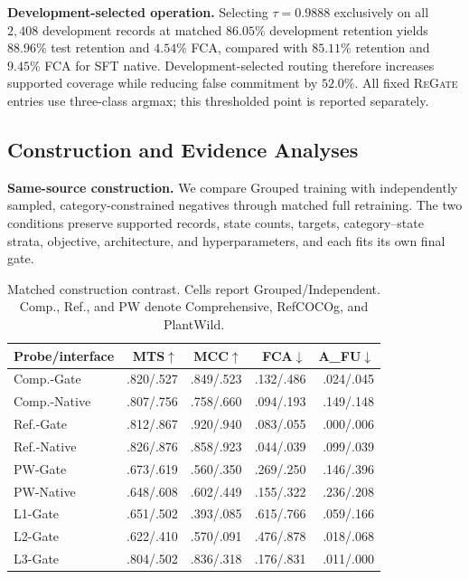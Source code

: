 \documentclass[letterpaper]{article}
\newcommand{\Method}{\textsc{ReGate}\xspace}
\begin{document}
\textbf{Development-selected operation.}
Selecting $\tau=0.9888$ exclusively on all $2{,}408$ development records at matched $86.05\%$ development retention yields $88.96\%$ test retention and $4.54\%$ FCA, compared with $85.11\%$ retention and $9.45\%$ FCA for SFT native. Development-selected routing therefore increases supported coverage while reducing false commitment by $52.0\%$. All fixed \Method entries use three-class argmax; this thresholded point is reported separately.

\subsection{Construction and Evidence Analyses}
\label{sec:diagnostic_probes}
\label{sec:grouping_ablation}

\textbf{Same-source construction.}
We compare Grouped training with independently sampled, category-constrained negatives through matched full retraining. The two conditions preserve supported records, state counts, targets, category--state strata, objective, architecture, and hyperparameters, and each fits its own final gate.

\begin{table}[t]
\centering
\small
\setlength{\tabcolsep}{0.7mm}
\begin{tabular*}{\columnwidth}{@{\extracolsep{\fill}}lrrrr@{}}
\toprule
Probe/interface & MTS$\uparrow$ & MCC$\uparrow$ & FCA$\downarrow$ & A\_FU$\downarrow$ \\
\midrule
Comp.-Gate & .820/.527 & .849/.523 & .132/.486 & .024/.045 \\
Comp.-Native & .807/.756 & .758/.660 & .094/.193 & .149/.148 \\
Ref.-Gate & .812/.867 & .920/.940 & .083/.055 & .000/.006 \\
Ref.-Native & .826/.876 & .858/.923 & .044/.039 & .099/.039 \\
PW-Gate & .673/.619 & .560/.350 & .269/.250 & .146/.396 \\
PW-Native & .648/.608 & .602/.449 & .155/.322 & .236/.208 \\
L1-Gate & .651/.502 & .393/.085 & .615/.766 & .059/.166 \\
L2-Gate & .622/.410 & .570/.091 & .476/.878 & .018/.068 \\
L3-Gate & .804/.502 & .836/.318 & .176/.831 & .011/.000 \\
\bottomrule
\end{tabular*}
\caption{Matched construction contrast. Cells report Grouped/Independent. Comp., Ref., and PW denote Comprehensive, RefCOCOg, and PlantWild.}
\label{tab:grouping_ablation}
\end{table}
\end{document}
